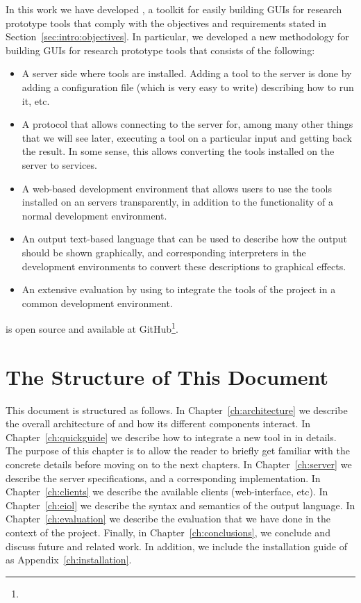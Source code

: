In this work we have developed \ei, a toolkit for easily building
GUIs for research prototype tools that comply with the objectives and
requirements stated in Section~\ref{sec:intro:objectives}. 
%
In particular, we developed a new methodology for building GUIs for
research prototype tools that consists of the following:

\begin{itemize}

\item A server side where tools are installed. Adding a tool to the
  server is done by adding a configuration file (which is very easy to
  write) describing how to run it, etc.

\item A protocol that allows connecting to the server for, among many
  other things that we will see later, executing a tool on a
  particular input and getting back the result. In some sense, this
  allows converting the tools installed on the server to services.

\item A web-based development environment that allows users to use the
  tools installed on an \ei servers transparently, in addition to
  the functionality of a normal development environment.
  
\item An output text-based language that can be used to describe how
  the output should be shown graphically, and corresponding
  interpreters in the development environments to convert these
  descriptions to graphical effects.

\item An extensive evaluation by using \ei to integrate the tools of
  the \envisage project in a common development environment.

\end{itemize}
%
\ei is open source and available at GitHub\footnote{\eigithub}.

\section{The Structure of This Document}

This document is structured as follows. 
%
In Chapter~\ref{ch:architecture} we describe the overall architecture
of \ei and how its different components interact.
%
In Chapter~\ref{ch:quickguide} we describe how to integrate a new
tool in \ei in details. The purpose of this chapter is to allow the
reader to briefly get familiar with the concrete details before moving
on to the next chapters.
%
In Chapter~\ref{ch:server} we describe the \ei server specifications,
and a corresponding implementation.
%
In Chapter~\ref{ch:clients} we describe the available clients
(web-interface, etc). 
%
In Chapter~\ref{ch:eiol} we describe the syntax and semantics of the
\ei output language. 
%
In Chapter~\ref{ch:evaluation} we describe the evaluation that we have
done in the context of the \envisage project.
%
Finally, in Chapter~\ref{ch:conclusions}, we conclude and discuss
future and related work.
%
In addition, we include the installation guide of \ei as
Appendix~\ref{ch:installation}.




